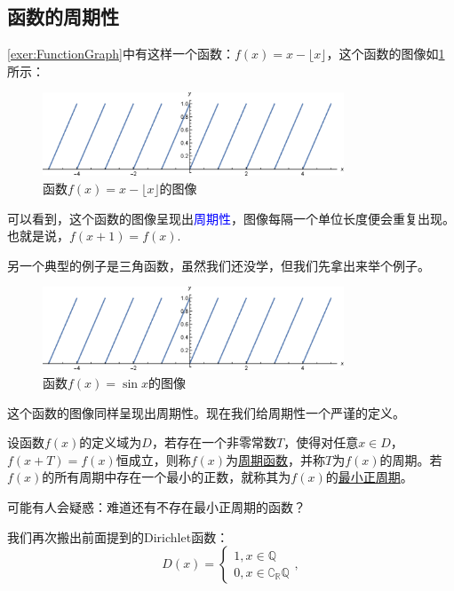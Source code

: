 \documentclass[lang=cn,math=cm,chinesefont=nofont,11pt,scheme=chinese,twocol]{elegantbook}
\begin{document}
\subsection{函数的周期性}

\ref{exer:FunctionGraph}中有这样一个函数：$f(x)=x-\lfloor x\rfloor$，这个函数的图像如\ref{2.2.4function1}所示：

\begin{figure}[h]
  \centering
  \includegraphics[width=0.8\textwidth]{image/2.2.4function1.eps}
  \caption{函数$f(x)=x-\lfloor x\rfloor$的图像}
  \label{2.2.4function1}
\end{figure}

可以看到，这个函数的图像呈现出\textcolor{blue}{周期性}，图像每隔一个单位长度便会重复出现。也就是说，$f(x+1)=f(x)$.

另一个典型的例子是三角函数，虽然我们还没学，但我们先拿出来举个例子。

\begin{figure}[h]
  \centering
  \includegraphics[width=0.8\textwidth]{image/2.2.4function1.eps}
  \caption{函数$f(x)=\sin x$的图像}
  \label{2.2.4function2}
\end{figure}

这个函数的图像同样呈现出周期性。现在我们给周期性一个严谨的定义。

\begin{definition}
  设函数$f(x)$的定义域为$D$，若存在一个非零常数$T$，使得对任意$x\in D$，$f(x+T)=f(x)$恒成立，则称$f(x)$为\underline{周期函数}，并称$T$为$f(x)$的周期。若$f(x)$的所有周期中存在一个最小的正数，就称其为$f(x)$的\underline{最小正周期}。
\end{definition}

可能有人会疑惑：难道还有不存在最小正周期的函数？

我们再次搬出前面提到的Dirichlet函数： 
$$D(x)=
\begin{cases}
  1,x\in\mathbb{Q}
  \\0,x\in\complement_{\mathbb{R}}\mathbb{Q}
\end{cases},$$
\end{document}

